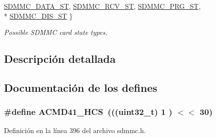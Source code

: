 \begin{DoxyCompactItemize}
\hyperlink{group___c_h_i_p___s_d_m_m_c___definitions_gga3d5ee2c34be91e20a16b951a7b23f098a4fa3e592dba7f784cbc877f0c869cbab}{S\+D\+M\+M\+C\+\_\+\+D\+A\+T\+A\+\_\+\+ST}, 
\hyperlink{group___c_h_i_p___s_d_m_m_c___definitions_gga3d5ee2c34be91e20a16b951a7b23f098ae5e420ef742b803afcca05b76c180564}{S\+D\+M\+M\+C\+\_\+\+R\+C\+V\+\_\+\+ST}, 
\hyperlink{group___c_h_i_p___s_d_m_m_c___definitions_gga3d5ee2c34be91e20a16b951a7b23f098a5d639aa90219ae9087a10fb316b170a3}{S\+D\+M\+M\+C\+\_\+\+P\+R\+G\+\_\+\+ST}, 
\\*
\hyperlink{group___c_h_i_p___s_d_m_m_c___definitions_gga3d5ee2c34be91e20a16b951a7b23f098a3946957a4bfb8b32d9b3cbbe0a81d31b}{S\+D\+M\+M\+C\+\_\+\+D\+I\+S\+\_\+\+ST}
 \}\begin{DoxyCompactList}\small\item\em Possible S\+D\+M\+MC card state types. \end{DoxyCompactList}
\end{DoxyCompactItemize}


\subsection{Descripción detallada}


\subsection{Documentación de los \textquotesingle{}defines\textquotesingle{}}
\subsubsection[{\texorpdfstring{A\+C\+M\+D41\+\_\+\+H\+CS}{ACMD41_HCS}}]{\setlength{\rightskip}{0pt plus 5cm}\#define A\+C\+M\+D41\+\_\+\+H\+CS~(((uint32\+\_\+t) 1 ) $<$$<$ 30)}\hypertarget{group___c_h_i_p___s_d_m_m_c___definitions_gad46a44a7d512d77fdef4b897604e90ba}{}\label{group___c_h_i_p___s_d_m_m_c___definitions_gad46a44a7d512d77fdef4b897604e90ba}


Definición en la línea 396 del archivo sdmmc.\+h.

